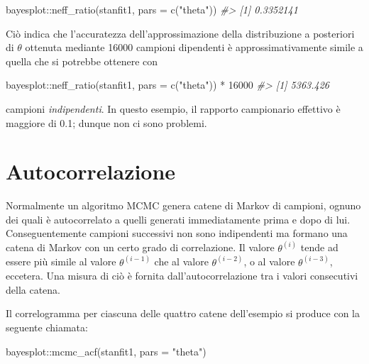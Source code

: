 \documentclass[
  11pt,
  italian,
  a4paper,
  extrafontsizes,onecolumn,openright
  ]{memoir}
\newenvironment{Shaded}{\begin{snugshade}}{\end{snugshade}}
\newcommand{\AttributeTok}[1]{\textcolor[rgb]{0.77,0.63,0.00}{#1}}
\newcommand{\CommentTok}[1]{\textcolor[rgb]{0.56,0.35,0.01}{\textit{#1}}}
\newcommand{\DecValTok}[1]{\textcolor[rgb]{0.00,0.00,0.81}{#1}}
\newcommand{\FunctionTok}[1]{\textcolor[rgb]{0.00,0.00,0.00}{#1}}
\newcommand{\NormalTok}[1]{#1}
\newcommand{\SpecialCharTok}[1]{\textcolor[rgb]{0.00,0.00,0.00}{#1}}
\newcommand{\StringTok}[1]{\textcolor[rgb]{0.31,0.60,0.02}{#1}}
\begin{document}
\begin{Shaded}
\begin{Highlighting}[]
\NormalTok{bayesplot}\SpecialCharTok{::}\FunctionTok{neff\_ratio}\NormalTok{(stanfit1, }\AttributeTok{pars =} \FunctionTok{c}\NormalTok{(}\StringTok{"theta"}\NormalTok{))}
\CommentTok{\#\textgreater{} [1] 0.3352141}
\end{Highlighting}
\end{Shaded}

Ciò indica che l'accuratezza dell'approssimazione della distribuzione a posteriori di \(\theta\) ottenuta mediante 16000 campioni dipendenti è approssimativamente simile a quella che si potrebbe ottenere con

\begin{Shaded}
\begin{Highlighting}[]
\NormalTok{bayesplot}\SpecialCharTok{::}\FunctionTok{neff\_ratio}\NormalTok{(stanfit1, }\AttributeTok{pars =} \FunctionTok{c}\NormalTok{(}\StringTok{"theta"}\NormalTok{)) }\SpecialCharTok{*} \DecValTok{16000}
\CommentTok{\#\textgreater{} [1] 5363.426}
\end{Highlighting}
\end{Shaded}

\noindent
campioni \emph{indipendenti}. In questo esempio, il rapporto campionario effettivo è maggiore di 0.1; dunque non ci sono problemi.

\hypertarget{autocorrelazione}{%
\section{Autocorrelazione}\label{autocorrelazione}}

Normalmente un algoritmo MCMC genera catene di Markov di campioni, ognuno dei quali è autocorrelato a quelli generati immediatamente prima e dopo di lui. Conseguentemente campioni successivi non sono indipendenti ma formano una catena di Markov con un certo grado di correlazione. Il valore \(\theta^{(i)}\) tende ad essere più simile al valore \(\theta^{(i-1)}\) che al valore \(\theta^{(i-2)}\), o al valore \(\theta^{(i-3)}\), eccetera. Una misura di ciò è fornita dall'autocorrelazione tra i valori consecutivi della catena.

Il correlogramma per ciascuna delle quattro catene dell'esempio si produce con la seguente chiamata:

\begin{Shaded}
\begin{Highlighting}[]
\NormalTok{bayesplot}\SpecialCharTok{::}\FunctionTok{mcmc\_acf}\NormalTok{(stanfit1, }\AttributeTok{pars =} \StringTok{"theta"}\NormalTok{)}
\end{Highlighting}
\end{Shaded}
\end{document}
